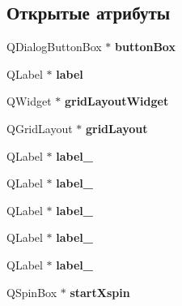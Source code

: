\subsection*{Открытые атрибуты}
\begin{DoxyCompactItemize}
\item 
\hypertarget{class_ui___dialog_a271a59402f80983c2722bb455db37365}{\-Q\-Dialog\-Button\-Box $\ast$ {\bfseries button\-Box}}\label{class_ui___dialog_a271a59402f80983c2722bb455db37365}

\item 
\hypertarget{class_ui___dialog_ac3844fd0281707dc5535826da7506ca5}{\-Q\-Label $\ast$ {\bfseries label}}\label{class_ui___dialog_ac3844fd0281707dc5535826da7506ca5}

\item 
\hypertarget{class_ui___dialog_af56f0c59b650c50a635d4b11890c172e}{\-Q\-Widget $\ast$ {\bfseries grid\-Layout\-Widget}}\label{class_ui___dialog_af56f0c59b650c50a635d4b11890c172e}

\item 
\hypertarget{class_ui___dialog_a41336d41594e8776a81d095e8e4ffc61}{\-Q\-Grid\-Layout $\ast$ {\bfseries grid\-Layout}}\label{class_ui___dialog_a41336d41594e8776a81d095e8e4ffc61}

\item 
\hypertarget{class_ui___dialog_acfbb1773ba7dc7aa425b0b3b8981686a}{\-Q\-Label $\ast$ {\bfseries label\-\_}}\label{class_ui___dialog_acfbb1773ba7dc7aa425b0b3b8981686a}

\item 
\hypertarget{class_ui___dialog_a3bb3c83086d124c6e85906f15c8add64}{\-Q\-Label $\ast$ {\bfseries label\-\_}}\label{class_ui___dialog_a3bb3c83086d124c6e85906f15c8add64}

\item 
\hypertarget{class_ui___dialog_a0f20bebec836535dc4cfcc33647dd2aa}{\-Q\-Label $\ast$ {\bfseries label\-\_}}\label{class_ui___dialog_a0f20bebec836535dc4cfcc33647dd2aa}

\item 
\hypertarget{class_ui___dialog_a640f65059bf215b0096f894e7ace21e3}{\-Q\-Label $\ast$ {\bfseries label\-\_}}\label{class_ui___dialog_a640f65059bf215b0096f894e7ace21e3}

\item 
\hypertarget{class_ui___dialog_a30b8516534f30c4241a55e3fb9dcd766}{\-Q\-Label $\ast$ {\bfseries label\-\_}}\label{class_ui___dialog_a30b8516534f30c4241a55e3fb9dcd766}

\item 
\hypertarget{class_ui___dialog_a5f086aee3984b8e6944d3b83a8429777}{\-Q\-Spin\-Box $\ast$ {\bfseries start\-Xspin}}\label{class_ui___dialog_a5f086aee3984b8e6944d3b83a8429777}


\end{DoxyCompactItemize}
